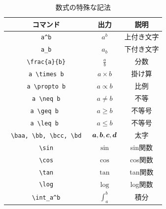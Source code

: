 \documentclass[twocolumn,a4j]{jarticle}
\begin{document}
\begin{table}[t]
 \caption{数式の特殊な記法}
 \label{tbl:mathsign}
  \centering
  \begin{tabular}{|c||c|c|} \hline
   コマンド & 出力 & 説明 \\ \hline \hline
   \verb|a^b| &  $a^b $ & 上付き文字 \\ \hline
   \verb|a_b| &  $a_b $ & 下付き文字 \\ \hline
   \verb|\frac{a}{b}| &  $\frac{a}{b}$ & 分数 \\ \hline
   \verb|a \times b| &  $a \times b$ & 掛け算 \\ \hline
   \verb|a \propto b| &  $a \propto b$ & 比例 \\ \hline
   \verb|a \neq b| &  $a \neq b$ & 不等 \\ \hline
   \verb|a \geq b | &  $ a \geq b $ & 不等号\footnotemark[2] \\ \hline
   \verb|a \leq b | &  $ a \leq b $ & 不等号 \\ \hline
   \verb| \baa, \bb, \bcc, \bd | &  ${ \boldsymbol a}, { \boldsymbol b}, { \boldsymbol c}, { \boldsymbol d}$ & 太字\footnotemark[3] \\ \hline
   \verb|\sin| &  $ \sin $ & sin関数 \\ \hline
   \verb|\cos| &  $ \cos $ &cos関数 \\ \hline
   \verb|\tan| &  $ \tan $ & tan関数 \\ \hline
   \verb|\log| &  $ \log $ & log関数 \\ \hline
   \verb|\int_a^b| &  $ \int_a^b $ & 積分 \\ \hline
  \end{tabular}
\end{table}

\end{document}
